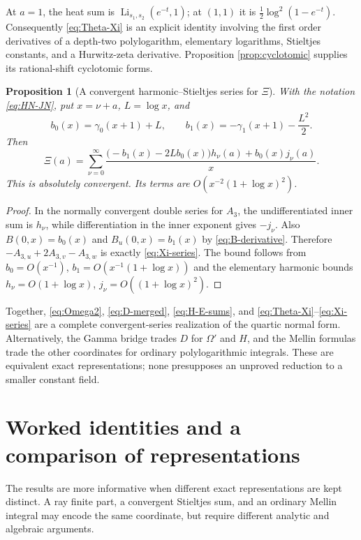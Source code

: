 \documentclass[11pt]{article}
\numberwithin{equation}{section}
\newtheorem{proposition}[theorem]{Proposition}
\theoremstyle{definition}
\newcommand{\Li}{\operatorname{Li}}
\begin{document}
At $a=1$, the heat sum is $\Li_{s_1,s_2}(e^{-t},1)$; at $(1,1)$ it
is $\tfrac12\log^2(1-e^{-t})$. Consequently
\eqref{eq:Theta-Xi} is an explicit identity involving the first order
derivatives of a depth-two polylogarithm, elementary logarithms, Stieltjes
constants, and a Hurwitz-zeta derivative. Proposition
\ref{prop:cyclotomic} supplies its rational-shift cyclotomic forms.

\begin{proposition}[A convergent harmonic--Stieltjes series for $\Xi$]
\label{prop:Xi-series}
With the notation \eqref{eq:HN-JN}, put $x=\nu+a$, $L=\log x$, and
\begin{equation}\label{eq:b01}
 b_0(x)=\gamma_0(x+1)+L,\qquad
 b_1(x)=-\gamma_1(x+1)-\frac{L^2}{2}.
\end{equation}
Then
\begin{equation}\label{eq:Xi-series}
 \Xi(a)=\sum_{\nu=0}^\infty
       \frac{\bigl(-b_1(x)-2L b_0(x)\bigr)h_\nu(a)
                         +b_0(x)j_\nu(a)}x.
\end{equation}
This is absolutely convergent. Its terms are
$O(x^{-2}(1+\log x)^2)$.
\end{proposition}
\begin{proof}
In the normally convergent double series for $A_3$, the undifferentiated
inner sum is $h_\nu$, while differentiation in the inner exponent gives
$-j_\nu$. Also $B(0,x)=b_0(x)$ and $B_u(0,x)=b_1(x)$ by
\eqref{eq:B-derivative}. Therefore
$-A_{3,u}+2A_{3,v}-A_{3,w}$ is exactly
\eqref{eq:Xi-series}. The bound follows from
$b_0=O(x^{-1})$, $b_1=O(x^{-1}(1+\log x))$ and the elementary harmonic
bounds $h_\nu=O(1+\log x)$, $j_\nu=O((1+\log x)^2)$.
\end{proof}

Together, \eqref{eq:Omega2}, \eqref{eq:D-merged},
\eqref{eq:H-E-sums}, and \eqref{eq:Theta-Xi}--\eqref{eq:Xi-series}
are a complete convergent-series realization of the quartic normal form.
Alternatively, the Gamma bridge trades $D$ for $\Omega'$ and $H$,
and the Mellin formulas trade the other coordinates for ordinary
polylogarithmic integrals. These are equivalent exact representations;
none presupposes an unproved reduction to a smaller constant field.

\section{Worked identities and a comparison of representations}
\label{sec:examples}
The results are more informative when different exact representations are
kept distinct. A ray finite part, a convergent Stieltjes sum, and an ordinary
Mellin integral may encode the same coordinate, but require different
analytic and algebraic arguments.
\end{document}
